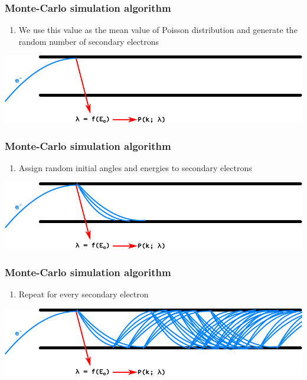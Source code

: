 \documentclass{beamer}
\begin{document}
    \begin{frame}
        \frametitle{Monte-Carlo simulation algorithm}
        \begin{enumerate}[3.]
            \item We use this value as the mean value of Poisson distribution and generate the random number of secondary electrons
        \end{enumerate}

        \begin{center}
            \includegraphics[width=\linewidth]{mc3.pdf}
        \end{center}
    \end{frame}

     \begin{frame}
        \frametitle{Monte-Carlo simulation algorithm}
        \begin{enumerate}[4.]
            \item Assign random initial angles and energies to secondary electrons
        \end{enumerate}

        \begin{center}
            \includegraphics[width=\linewidth]{mc4.pdf}
        \end{center}
    \end{frame}

    \begin{frame}
        \frametitle{Monte-Carlo simulation algorithm}
        \begin{enumerate}[5.]
            \item Repeat for every secondary electron
        \end{enumerate}

        \begin{center}
            \includegraphics[width=\linewidth]{mc5.pdf}
        \end{center}
    \end{frame}
\end{document}
